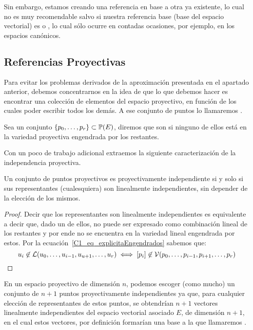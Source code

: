 Sin embargo, estamos creando una referencia en base a otra ya existente, lo cual no es muy recomendable salvo si nuestra referencia base (base del espacio vectorial) es  o , lo cual sólo ocurre en contadas ocasiones, por ejemplo, en los espacios canónicos.
\subsection{Referencias Proyectivas}
Para evitar los problemas derivados de la aproximación presentada en el apartado anterior, debemos concentrarnos en la idea de que lo que debemos hacer es encontrar una colección de elementos del espacio proyectivo, en función de los cuales poder escribir todos los demás. A ese conjunto de puntos lo llamaremos .
\begin{defi}
	\label{C1_def_independenciaProyectiva}
	Sea un conjunto $\{p_0,\dots,p_r\}\subset\mathbb{P}(E)$, diremos que son  si ninguno de ellos está en la variedad proyectiva engendrada por los restantes.
\end{defi}
Con un poco de trabajo adicional extraemos la siguiente caracterización de la independencia proyectiva.
\begin{lem}
	\label{C1_lem_caracterizacionIndependencia}
	Un conjunto de puntos proyectivos es proyectivamente independiente si y solo si sus representantes (cualesquiera) son linealmente independientes, sin depender de la elección de los mismos. 
\end{lem}
\begin{proof}
	Decir que los representantes son linealmente independientes es equivalente a decir que, dado un de ellos, no puede ser expresado como combinación lineal de los restantes y por ende no se encuentra en la variedad lineal engendrada por estos. Por la ecuación~\eqref{C1_eq_explicitaEngendrados} sabemos que:
	\[u_i\not\in\mathcal{L}(u_0,\dots,u_{i-1},u_{u+1},\dots,u_{r})\iff\left [ p_i \right ]\not\in\mathcal{V}(p_0,\dots,p_{i-1},p_{i+1},\dots,p_r)\]
\end{proof}
\begin{obs}
	\label{C1_obs_baseInducida}
	En un espacio proyectivo de dimensión $n$, podemos escoger (como mucho) un conjunto de $n+1$ puntos proyectivamente independientes ya que, para cualquier elección de representantes de estos puntos, se obtendrían $n+1$ vectores linealmente independientes del espacio vectorial asociado $E$, de dimensión $n+1$, en el cual estos vectores, por definición formarían una base a la que llamaremos .
\end{obs}
